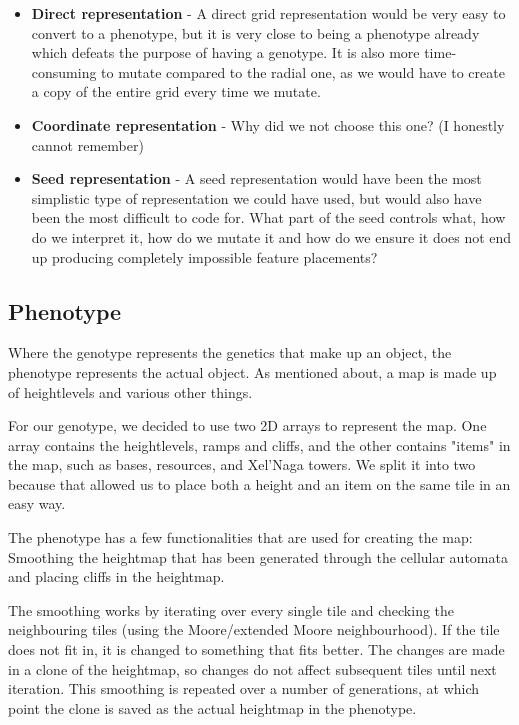 \begin{itemize}

	\item \textbf{Direct representation} - A direct grid representation would be very easy to convert to a phenotype, but it is very close to being a phenotype already which defeats the purpose of having a genotype. It is also more time-consuming to mutate compared to the radial one, as we would have to create a copy of the entire grid every time we mutate.

	\item \textbf{Coordinate representation} - Why did we not choose this one? (I honestly cannot remember)

	\item \textbf{Seed representation} - A seed representation would have been the most simplistic type of representation we could have used, but would also have been the most difficult to code for. What part of the seed controls what, how do we interpret it, how do we mutate it and how do we ensure it does not end up producing completely impossible feature placements?

\end{itemize}

\subsection{Phenotype}
\label{MapRepresentation_Phenotype}

Where the genotype represents the genetics that make up an object, the phenotype represents the actual object. As mentioned about, a map is made up of heightlevels and various other things.

For our genotype, we decided to use two 2D arrays to represent the map. One array contains the heightlevels, ramps and cliffs, and the other contains "items" in the map, such as bases, resources, and Xel'Naga towers. We split it into two because that allowed us to place both a height and an item on the same tile in an easy way.

The phenotype has a few functionalities that are used for creating the map: Smoothing the heightmap that has been generated through the cellular automata and placing cliffs in the heightmap. 

The smoothing works by iterating over every single tile and checking the neighbouring tiles (using the Moore/extended Moore neighbourhood). If the tile does not fit in, it is changed to something that fits better. The changes are made in a clone of the heightmap, so changes do not affect subsequent tiles until next iteration. This smoothing is repeated over a number of generations, at which point the clone is saved as the actual heightmap in the phenotype.

